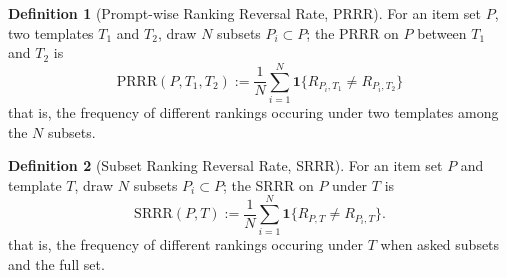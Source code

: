 \documentclass[11pt]{article}
\theoremstyle{definition}
\newtheorem{definition}{Definition}
\begin{document}
\begin{definition}[Prompt-wise Ranking Reversal Rate, PRRR]
    For an item set $P$, two templates $T_1$ and $T_2$, draw $N$ subsets $P_i \subset P$; the PRRR on $P$ between $T_1$ and $T_2$ is
    $$\text{PRRR}(P, T_1, T_2):= \frac{1}{N} \sum_{i=1}^{N} \mathbf{1}\big\{ R_{P_i,T_1}\neq R_{P_i,T_2}\big\}$$
    that is, the frequency of different rankings occuring under two templates among the $N$ subsets.
\end{definition}

\begin{definition}[Subset Ranking Reversal Rate, SRRR]
    For an item set $P$ and template $T$, draw $N$ subsets $P_i \subset P$; the SRRR on $P$ under $T$ is
    $$\text{SRRR}(P, T) := \frac{1}{N} \sum_{i=1}^{N} \mathbf{1}\big\{R_{P,T}\neq R_{P_i,T}\big\}.$$
    that is, the frequency of different rankings occuring under $T$ when asked subsets and the full set.
\end{definition}

\end{document}

